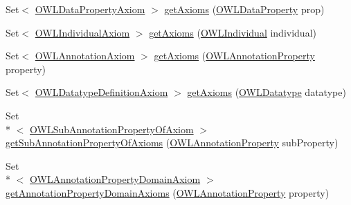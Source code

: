 \begin{DoxyCompactItemize}
\item 
Set$<$ \hyperlink{interfaceorg_1_1semanticweb_1_1owlapi_1_1model_1_1_o_w_l_data_property_axiom}{O\-W\-L\-Data\-Property\-Axiom} $>$ \hyperlink{interfaceorg_1_1semanticweb_1_1owlapi_1_1model_1_1_o_w_l_ontology_a5bef1f35c781c286f6def426758feee0}{get\-Axioms} (\hyperlink{interfaceorg_1_1semanticweb_1_1owlapi_1_1model_1_1_o_w_l_data_property}{O\-W\-L\-Data\-Property} prop)
\item 
Set$<$ \hyperlink{interfaceorg_1_1semanticweb_1_1owlapi_1_1model_1_1_o_w_l_individual_axiom}{O\-W\-L\-Individual\-Axiom} $>$ \hyperlink{interfaceorg_1_1semanticweb_1_1owlapi_1_1model_1_1_o_w_l_ontology_ad149bd5af45e38d372bd8f82d1de775f}{get\-Axioms} (\hyperlink{interfaceorg_1_1semanticweb_1_1owlapi_1_1model_1_1_o_w_l_individual}{O\-W\-L\-Individual} individual)
\item 
Set$<$ \hyperlink{interfaceorg_1_1semanticweb_1_1owlapi_1_1model_1_1_o_w_l_annotation_axiom}{O\-W\-L\-Annotation\-Axiom} $>$ \hyperlink{interfaceorg_1_1semanticweb_1_1owlapi_1_1model_1_1_o_w_l_ontology_a49e71615a9dbc89056a934c418495adf}{get\-Axioms} (\hyperlink{interfaceorg_1_1semanticweb_1_1owlapi_1_1model_1_1_o_w_l_annotation_property}{O\-W\-L\-Annotation\-Property} property)
\item 
Set$<$ \hyperlink{interfaceorg_1_1semanticweb_1_1owlapi_1_1model_1_1_o_w_l_datatype_definition_axiom}{O\-W\-L\-Datatype\-Definition\-Axiom} $>$ \hyperlink{interfaceorg_1_1semanticweb_1_1owlapi_1_1model_1_1_o_w_l_ontology_a3ac4cd12ca8d220ab5bc8b0600db117b}{get\-Axioms} (\hyperlink{interfaceorg_1_1semanticweb_1_1owlapi_1_1model_1_1_o_w_l_datatype}{O\-W\-L\-Datatype} datatype)
\item 
Set\\*
$<$ \hyperlink{interfaceorg_1_1semanticweb_1_1owlapi_1_1model_1_1_o_w_l_sub_annotation_property_of_axiom}{O\-W\-L\-Sub\-Annotation\-Property\-Of\-Axiom} $>$ \hyperlink{interfaceorg_1_1semanticweb_1_1owlapi_1_1model_1_1_o_w_l_ontology_ac794aee2964f5c73eb055d136577caba}{get\-Sub\-Annotation\-Property\-Of\-Axioms} (\hyperlink{interfaceorg_1_1semanticweb_1_1owlapi_1_1model_1_1_o_w_l_annotation_property}{O\-W\-L\-Annotation\-Property} sub\-Property)
\item 
Set\\*
$<$ \hyperlink{interfaceorg_1_1semanticweb_1_1owlapi_1_1model_1_1_o_w_l_annotation_property_domain_axiom}{O\-W\-L\-Annotation\-Property\-Domain\-Axiom} $>$ \hyperlink{interfaceorg_1_1semanticweb_1_1owlapi_1_1model_1_1_o_w_l_ontology_ae01c8e5cb04861656b9358f28afde790}{get\-Annotation\-Property\-Domain\-Axioms} (\hyperlink{interfaceorg_1_1semanticweb_1_1owlapi_1_1model_1_1_o_w_l_annotation_property}{O\-W\-L\-Annotation\-Property} property)

\end{DoxyCompactItemize}
